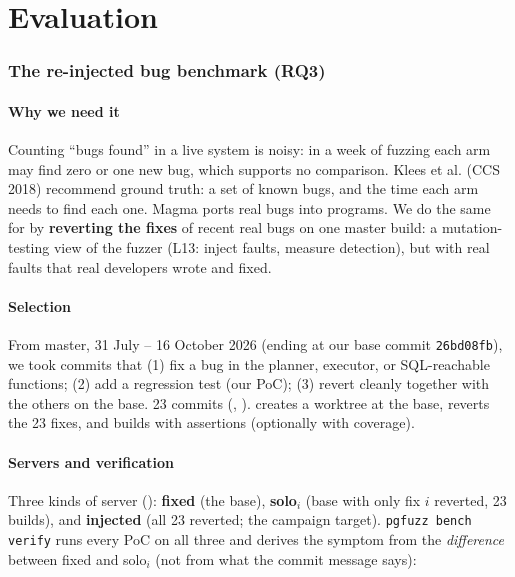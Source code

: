 \part{Evaluation}

\section{The re-injected bug benchmark (RQ3)}
\label{sec:bench}

\subsection{Why we need it}

Counting ``bugs found'' in a live system is noisy: in a week of fuzzing each
arm may find zero or one new bug, which supports no comparison. Klees et al.
(CCS 2018) recommend ground truth: a set of known bugs, and the time each arm
needs to find each one. Magma ports real bugs into programs. We do the same
for \pg by \textbf{reverting the fixes} of recent real bugs on one master
build: a mutation-testing view of the fuzzer (L13: inject faults, measure
detection), but with real faults that real developers wrote and fixed.

\subsection{Selection}

From master, 31 July -- 16 October 2026 (ending at our base commit
\texttt{26bd08fb}), we took commits that (1) fix a bug in the planner,
executor, or SQL-reachable functions; (2) add a regression test (our PoC);
(3) revert cleanly together with the others on the base. 23 commits
(, ).
 creates a worktree at the base, reverts the
23 fixes, and builds with assertions (optionally with coverage).

\subsection{Servers and verification}

Three kinds of server (): \textbf{fixed} (the
base), \textbf{solo}$_i$ (base with only fix $i$ reverted, 23 builds), and
\textbf{injected} (all 23 reverted; the campaign target).
\texttt{pgfuzz bench verify} runs every PoC on all three and derives the
symptom from the \emph{difference} between fixed and solo$_i$ (not from what the
commit message says):

